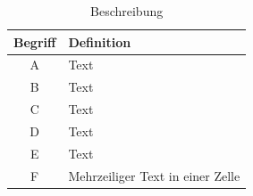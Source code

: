 \begin{table}[h]
\centering
\begin{tabular}{cp{3.5cm}}
\textbf{Begriff} & \textbf{Definition}\\
\hline %
A	&	Text \\
B	&	Text \\ 
C	&	Text \\
D	&	Text \\
E	&	Text \\
F	&	Mehrzeiliger Text \newline in einer Zelle \\
\end{tabular}
\caption{Beschreibung}
\label{tab:tabelle}
\end{table}

